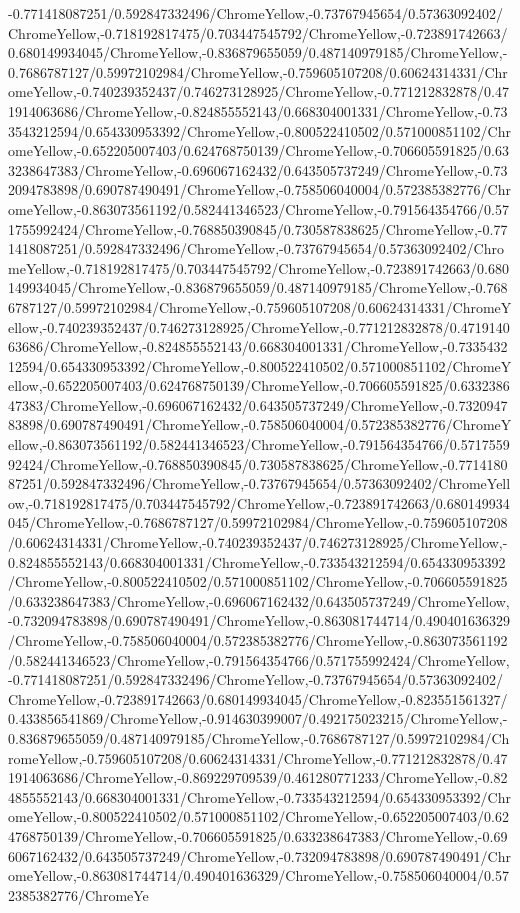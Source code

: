 {\begin{tikzternal}
{-0.771418087251/0.592847332496/ChromeYellow,-0.73767945654/0.57363092402/ChromeYellow,-0.718192817475/0.703447545792/ChromeYellow,-0.723891742663/0.680149934045/ChromeYellow,-0.836879655059/0.487140979185/ChromeYellow,-0.7686787127/0.59972102984/ChromeYellow,-0.759605107208/0.60624314331/ChromeYellow,-0.740239352437/0.746273128925/ChromeYellow,-0.771212832878/0.471914063686/ChromeYellow,-0.824855552143/0.668304001331/ChromeYellow,-0.733543212594/0.654330953392/ChromeYellow,-0.800522410502/0.571000851102/ChromeYellow,-0.652205007403/0.624768750139/ChromeYellow,-0.706605591825/0.633238647383/ChromeYellow,-0.696067162432/0.643505737249/ChromeYellow,-0.732094783898/0.690787490491/ChromeYellow,-0.758506040004/0.572385382776/ChromeYellow,-0.863073561192/0.582441346523/ChromeYellow,-0.791564354766/0.571755992424/ChromeYellow,-0.768850390845/0.730587838625/ChromeYellow,-0.771418087251/0.592847332496/ChromeYellow,-0.73767945654/0.57363092402/ChromeYellow,-0.718192817475/0.703447545792/ChromeYellow,-0.723891742663/0.680149934045/ChromeYellow,-0.836879655059/0.487140979185/ChromeYellow,-0.7686787127/0.59972102984/ChromeYellow,-0.759605107208/0.60624314331/ChromeYellow,-0.740239352437/0.746273128925/ChromeYellow,-0.771212832878/0.471914063686/ChromeYellow,-0.824855552143/0.668304001331/ChromeYellow,-0.733543212594/0.654330953392/ChromeYellow,-0.800522410502/0.571000851102/ChromeYellow,-0.652205007403/0.624768750139/ChromeYellow,-0.706605591825/0.633238647383/ChromeYellow,-0.696067162432/0.643505737249/ChromeYellow,-0.732094783898/0.690787490491/ChromeYellow,-0.758506040004/0.572385382776/ChromeYellow,-0.863073561192/0.582441346523/ChromeYellow,-0.791564354766/0.571755992424/ChromeYellow,-0.768850390845/0.730587838625/ChromeYellow,-0.771418087251/0.592847332496/ChromeYellow,-0.73767945654/0.57363092402/ChromeYellow,-0.718192817475/0.703447545792/ChromeYellow,-0.723891742663/0.680149934045/ChromeYellow,-0.7686787127/0.59972102984/ChromeYellow,-0.759605107208/0.60624314331/ChromeYellow,-0.740239352437/0.746273128925/ChromeYellow,-0.824855552143/0.668304001331/ChromeYellow,-0.733543212594/0.654330953392/ChromeYellow,-0.800522410502/0.571000851102/ChromeYellow,-0.706605591825/0.633238647383/ChromeYellow,-0.696067162432/0.643505737249/ChromeYellow,-0.732094783898/0.690787490491/ChromeYellow,-0.863081744714/0.490401636329/ChromeYellow,-0.758506040004/0.572385382776/ChromeYellow,-0.863073561192/0.582441346523/ChromeYellow,-0.791564354766/0.571755992424/ChromeYellow,-0.771418087251/0.592847332496/ChromeYellow,-0.73767945654/0.57363092402/ChromeYellow,-0.723891742663/0.680149934045/ChromeYellow,-0.823551561327/0.433856541869/ChromeYellow,-0.914630399007/0.492175023215/ChromeYellow,-0.836879655059/0.487140979185/ChromeYellow,-0.7686787127/0.59972102984/ChromeYellow,-0.759605107208/0.60624314331/ChromeYellow,-0.771212832878/0.471914063686/ChromeYellow,-0.869229709539/0.461280771233/ChromeYellow,-0.824855552143/0.668304001331/ChromeYellow,-0.733543212594/0.654330953392/ChromeYellow,-0.800522410502/0.571000851102/ChromeYellow,-0.652205007403/0.624768750139/ChromeYellow,-0.706605591825/0.633238647383/ChromeYellow,-0.696067162432/0.643505737249/ChromeYellow,-0.732094783898/0.690787490491/ChromeYellow,-0.863081744714/0.490401636329/ChromeYellow,-0.758506040004/0.572385382776/ChromeYe}
\end{tikzternal}}
